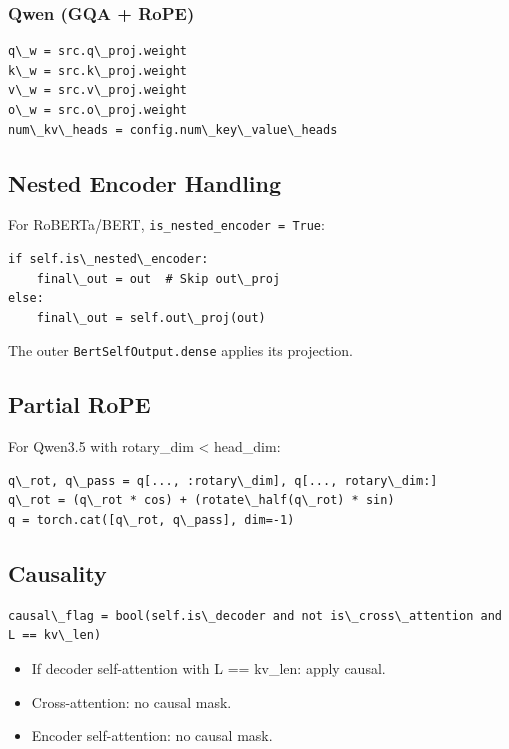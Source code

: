 \subsubsection{Qwen (GQA + RoPE)}
\begin{lstlisting}
q\_w = src.q\_proj.weight
k\_w = src.k\_proj.weight
v\_w = src.v\_proj.weight
o\_w = src.o\_proj.weight
num\_kv\_heads = config.num\_key\_value\_heads
\end{lstlisting}

\subsection{Nested Encoder Handling}

For RoBERTa/BERT, \texttt{is\_nested\_encoder = True}:

\begin{lstlisting}
if self.is\_nested\_encoder:
    final\_out = out  # Skip out\_proj
else:
    final\_out = self.out\_proj(out)
\end{lstlisting}

The outer \texttt{BertSelfOutput.dense} applies its projection.

\subsection{Partial RoPE}

For Qwen3.5 with rotary\_dim \textless{} head\_dim:

\begin{lstlisting}
q\_rot, q\_pass = q[..., :rotary\_dim], q[..., rotary\_dim:]
q\_rot = (q\_rot * cos) + (rotate\_half(q\_rot) * sin)
q = torch.cat([q\_rot, q\_pass], dim=-1)
\end{lstlisting}

\subsection{Causality}

\begin{lstlisting}
causal\_flag = bool(self.is\_decoder and not is\_cross\_attention and L == kv\_len)
\end{lstlisting}

\begin{itemize}
\item If decoder self-attention with L == kv\_len: apply causal.
\item Cross-attention: no causal mask.
\item Encoder self-attention: no causal mask.

\end{itemize}
